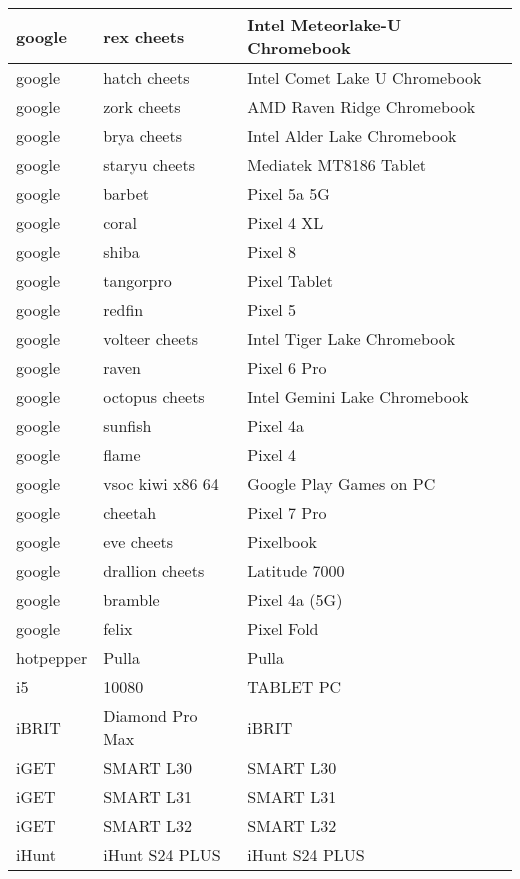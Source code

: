 \begin{tabularx}{\linewidth}{|l|X|X|}
        google & rex cheets & Intel Meteorlake-U Chromebook \\ \hline
        google & hatch cheets & Intel Comet Lake U Chromebook \\ \hline
        google & zork cheets & AMD Raven Ridge Chromebook \\ \hline
        google & brya cheets & Intel Alder Lake Chromebook \\ \hline
        google & staryu cheets & Mediatek MT8186 Tablet \\ \hline
        google & barbet & Pixel 5a 5G \\ \hline
        google & coral & Pixel 4 XL \\ \hline
        google & shiba & Pixel 8 \\ \hline
        google & tangorpro & Pixel Tablet \\ \hline
        google & redfin & Pixel 5 \\ \hline
        google & volteer cheets & Intel Tiger Lake Chromebook \\ \hline
        google & raven & Pixel 6 Pro \\ \hline
        google & octopus cheets & Intel Gemini Lake Chromebook \\ \hline
        google & sunfish & Pixel 4a \\ \hline
        google & flame & Pixel 4 \\ \hline
        google & vsoc kiwi x86 64 & Google Play Games on PC \\ \hline
        google & cheetah & Pixel 7 Pro \\ \hline
        google & eve cheets & Pixelbook \\ \hline
        google & drallion cheets & Latitude 7000 \\ \hline
        google & bramble & Pixel 4a (5G) \\ \hline
        google & felix & Pixel Fold \\ \hline
        hotpepper & Pulla & Pulla \\ \hline
        i5 & 10080 & TABLET PC \\ \hline
        iBRIT & Diamond Pro Max & iBRIT \\ \hline
        iGET & SMART L30 & SMART L30 \\ \hline
        iGET & SMART L31 & SMART L31 \\ \hline
        iGET & SMART L32 & SMART L32 \\ \hline
        iHunt & iHunt S24 PLUS & iHunt S24 PLUS \\ \hline

\end{tabularx}
